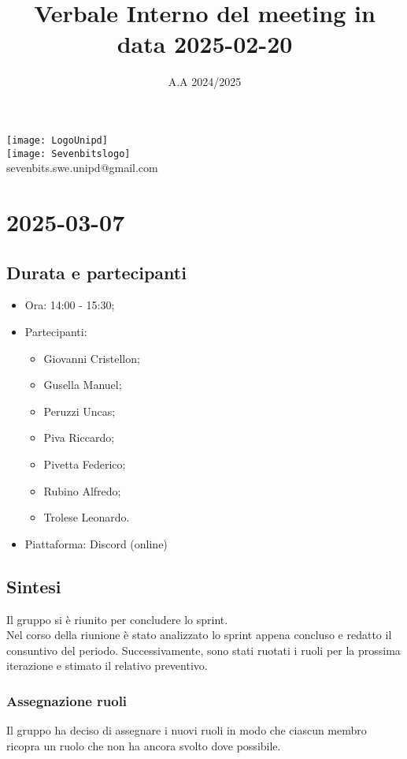 \documentclass[10pt]{article}
\title{Verbale Interno del meeting in data 2025-02-20}
\date{A.A 2024/2025}
\begin{document}
\maketitle
\begin{center}
\texttt{[image: LogoUnipd]}\\
\texttt{[image: Sevenbitslogo]}\\
sevenbits.swe.unipd@gmail.com\\
\vspace{2mm}

\newpage
\tableofcontents
\newpage
\section{2025-03-07}
\subsection{Durata e partecipanti}
\begin{itemize}
\item Ora: 14:00 - 15:30;
\item Partecipanti:
	\begin{itemize}
    	\item Giovanni Cristellon;
		\item Gusella Manuel;
		\item Peruzzi Uncas;
		\item Piva Riccardo;
		\item Pivetta Federico;
		\item Rubino Alfredo;
		\item Trolese Leonardo.
	\end{itemize}
\item Piattaforma: Discord (online)
\end{itemize}

\subsection{Sintesi}
Il gruppo si è riunito per concludere lo sprint.\\
Nel corso della riunione è stato analizzato lo sprint appena concluso e redatto il consuntivo del periodo. Successivamente, sono stati ruotati i ruoli per la prossima iterazione e stimato il relativo preventivo.

\subsubsection{Assegnazione ruoli}
Il gruppo ha deciso di assegnare i nuovi ruoli in modo che ciascun membro ricopra un ruolo che non ha ancora svolto dove possibile.


\end{center}
\end{document}
